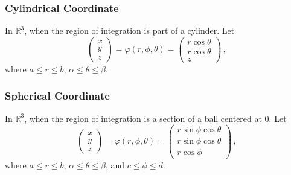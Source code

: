 \documentclass[aspectratio=169]{beamer}
\newcommand{\R}{\mathbb{R}}
\begin{document}
\begin{frame}
    \frametitle{Cylindrical Coordinate}
    In $\R^3$, when the region of integration is part of a cylinder.
    Let
    \begin{equation*}
        \begin{pmatrix}
            x \\ y \\z
        \end{pmatrix}
        =
        \varphi(r,\phi,\theta) = 
        \begin{pmatrix}
            r\cos\theta\\
            r\cos\theta\\
            z
        \end{pmatrix} \,,
    \end{equation*}
    where $ a \leq r \leq b$, $\alpha \leq \theta \leq \beta$.
\end{frame}

\begin{frame}
    \frametitle{Spherical Coordinate}
    In $\R^3$, when the region of integration is a section of a ball centered at $0$.
    Let
    \begin{equation*}
        \begin{pmatrix}
            x \\ y \\z
        \end{pmatrix}
        =
        \varphi(r,\phi,\theta) = 
        \begin{pmatrix}
            r\sin\phi\cos\theta\\
            r\sin\phi\cos\theta\\
            r \cos\phi
        \end{pmatrix} \,,
    \end{equation*}
    where $ a \leq r \leq b$, $\alpha \leq \theta \leq \beta$, and 
    $c \leq \phi \leq d$.
\end{frame}
\end{document}
